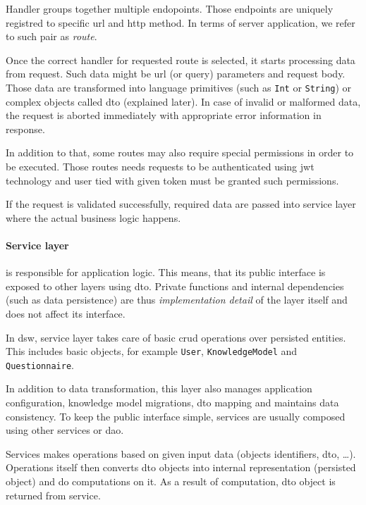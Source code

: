 Handler groups together multiple endopoints.
Those endpoints are uniquely registred to specific \gls{url} and \gls{http} method.
In terms of server application, we refer to such pair as \textit{route}.


Once the correct handler for requested route is selected, it starts processing data from request.
Such data might be \gls{url} (or query) parameters and request body.
Those data are transformed into language primitives (such as \texttt{Int} or \texttt{String}) or complex objects called \gls{dto} (explained later).
In case of invalid or malformed data, the request is aborted immediately with appropriate error information in response.

In addition to that, some routes may also require special permissions in order to be executed.
Those routes needs requests to be authenticated using \gls{jwt} technology and user tied with given token must be granted such permissions.

If the request is validated successfully, required data are passed into service layer where the actual business logic happens.

\paragraph*{Service layer} is responsible for application logic.
This means, that its public interface is exposed to other layers using \gls{dto}.
Private functions and internal dependencies (such as data persistence) are thus \textit{implementation detail} of the layer itself and does not affect its interface.

In \gls{dsw}, service layer takes care of basic \gls{crud} operations over persisted entities.
This includes basic objects, for example \texttt{User}, \texttt{KnowledgeModel} and \texttt{Questionnaire}.


In addition to data transformation, this layer also manages application configuration, knowledge model migrations, \gls{dto} mapping and maintains data consistency.
To keep the public interface simple, services are usually composed using other services or \gls{dao}.

Services makes operations based on given input data (objects identifiers, \gls{dto}, \dots).
Operations itself then converts \gls{dto} objects into internal representation (persisted object) and do computations on it.
As a result of computation, \gls{dto} object is returned from service.

